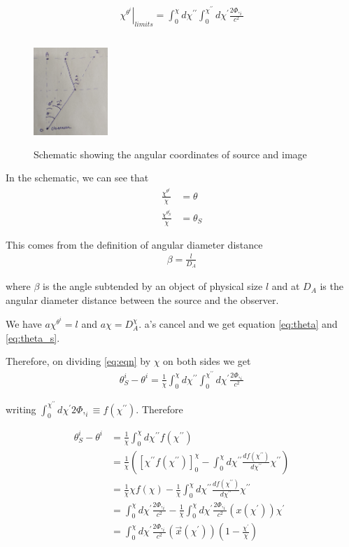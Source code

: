 \documentclass[12pt]{article}
\newcommand{\beqa}{\begin{eqnarray}}
\newcommand{\eeqa}{\end{eqnarray}}
\numberwithin{equation}{section}
\begin{document}
\beqa
\left. \chi^{\theta^i} \right	|_{limits} = \int_{0}^{\chi} d\chi^{\prime \prime} \int_{0}^{\chi^{\prime \prime}}d\chi^{\prime} \frac{2 \Phi,_i}{c^2}
\label{eq:eqn}
\eeqa

\begin{figure}[h]
    \centering
	\includegraphics[width=0.25\textwidth, height=4cm]{lensing_schematic}
	\caption{Schematic showing the angular coordinates of source and image}
	\label{fig:lensing_schematic}
\end{figure}


In the schematic, we can see that
\beqa
\frac{\chi^{\theta^i}}{\chi} &= \theta \label{eq:theta}\\ 
\frac{\chi^{\theta_S^i}}{\chi} &= \theta_S \label{eq:theta_s}
\eeqa

This comes from the definition of angular diameter distance
\beqa
\beta = \frac{l}{D_A}
\eeqa

where $\beta$ is the angle subtended by an object of physical size $l$ and at $D_A$ is the angular diameter distance between the source and the observer. 


We have $a\chi^{\theta^i} = l$ and $a\chi = D_A^\chi$. a's cancel and we get equation \ref{eq:theta} and \ref{eq:theta_s}.

Therefore, on dividing \ref{eq:eqn} by $\chi$ on both sides we get
\beqa
\theta_S^i - \theta^i = \frac{1}{\chi}\int_{0}^{\chi} d\chi^{\prime \prime} \int_{0}^{\chi^{\prime \prime}}d\chi^{\prime} \frac{2 \Phi,_i}{c^2} 
\eeqa

writing $\int_{0}^{\chi^{\prime \prime}}d\chi^{\prime} 2 \Phi,_{i} \equiv f(\chi^{\prime \prime})$. Therefore

\begin{equation}
\begin{aligned}
\theta_S^i - \theta^i &= \frac{1}{\chi}\int_{0}^{\chi} d\chi^{\prime \prime} f(\chi^{\prime \prime}) 
\\
& = \frac{1}{\chi} \left( \left[\chi^{\prime \prime} f(\chi^{\prime \prime}) \right]_0^{\chi} - \int_{0}^{\chi} d\chi^{\prime \prime} \frac{df(\chi^{\prime \prime})} {d\chi^{\prime \prime}}\chi^{\prime \prime}  \right)
\\
& = \frac{1}{\chi}\chi f(\chi)- \frac{1}{\chi}\int_{0}^{\chi} d\chi^{\prime \prime} \frac{df(\chi^{\prime \prime})} {d\chi^{\prime \prime}}\chi^{\prime \prime} 
\\
&= \int_{0}^{\chi}d\chi^{\prime} \frac{2 \Phi,_i}{c^2} - \frac{1}{\chi}\int_{0}^{\chi}d\chi^{\prime} \frac{2 \Phi,_i}{c^2}(x(\chi^{\prime})) \chi^{\prime}
\\
&= \int_{0}^{\chi} d\chi^{\prime} \frac{2 \Phi,_i}{c^2}(\vec{x}(\chi^{\prime})) \left(1 - \frac{\chi^{\prime}}{\chi}\right)
\end{aligned}
\end{equation}
\end{document}
